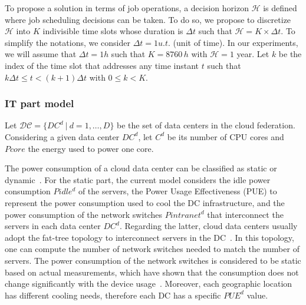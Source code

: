 
To propose a solution in terms of job operations, a decision horizon $\mathcal{H}$ is defined where job scheduling decisions can be taken. To do so, we propose to discretize $\mathcal{H}$ into $K$ indivisible time slots whose duration is $\Delta t$ such that $\mathcal{H} = K\times\Delta t$. To simplify the notations, we consider $\Delta t = 1 u.t.$ (unit of time). In our experiments, we will assume that $\Delta t = 1h$ such that $K = 8760\,h$ with $\mathcal{H} = 1$ year. 
Let $k$ be the index of the time slot that addresses any time instant $t$ such that $k\Delta t\leq t < (k+1)\Delta t$ with $0\leq k< K$. 


\subsubsection{IT part model} 

Let $\mathcal{DC} = \{DC^d \ | \ d=1, \ldots, D\}$ be the set of data centers in the cloud federation. Considering a given data center $DC^d$, let $C^d$ be its number of CPU cores and $Pcore$ the energy used to power one core.


The power consumption of a cloud data center can be classified as static or dynamic~\cite{ahvar22_estimating_cloud_cons}. For the static part, the current model considers the idle power consumption $Pidle^d$ of the servers, the Power Usage Effectiveness (PUE) to represent the power consumption used to cool the DC infrastructure, and the power consumption of the network switches $Pintranet^d$ that interconnect the servers in each data center $DC^d$. Regarding the latter, cloud data centers usually adopt the fat-tree topology to interconnect servers in the DC~\cite{ahvar22_estimating_cloud_cons}. In this topology, one can compute the number of network switches needed to match the number of servers. The power consumption of the network switches is considered to be static based on actual measurements, which have shown that the consumption does not change significantly with the device usage~\cite{Hlavacs2009_energy_network_devices}. Moreover, each geographic location has different cooling needs, therefore each DC has a specific $PUE^d$ value. 

